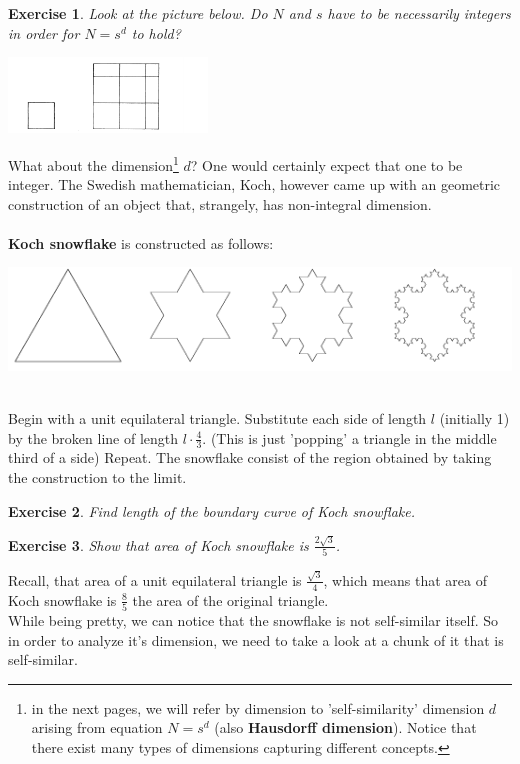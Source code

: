 \documentclass[12pt]{article}
\newtheorem{exercise}{Exercise}
\begin{document}
\begin{exercise}
Look at the picture below. Do $N$ and $s$ have to be necessarily integers in order for $N = s^d$ to hold?
\end{exercise}
\centerline{\includegraphics[width = 200px]{non_integer_square}\\}
\noindent What about the dimension\footnote{in the next pages, we will refer by dimension to 'self-similarity' dimension $d$ arising from equation $N = s^d$ (also \textbf{Hausdorff dimension}). Notice that there exist many types of dimensions capturing different concepts.} $d$? One would certainly expect that one to be integer. The Swedish mathematician, Koch, however came up with an geometric construction of an object that, strangely, has non-integral dimension. \\\\
\textbf{Koch snowflake} is constructed as follows: \\
\centerline{\includegraphics[width = \textwidth]{koch}}\\
Begin with a unit equilateral triangle. Substitute each side of length $l$ (initially 1) by the broken line of length $l\cdot\frac{4}{3}$. (This is just 'popping' a triangle in the middle third of a side) Repeat. The snowflake consist of the region obtained by taking the construction to the limit. 
\begin{exercise}
Find length of the boundary curve of Koch snowflake.
\end{exercise}
\begin{exercise}
Show that area of Koch snowflake is $\frac{2\sqrt{3}}{5}$.
\end{exercise}
\noindent Recall, that area of a unit equilateral triangle is $\frac{\sqrt{3}}{4}$, which means that area of Koch snowflake is $\frac{8}{5}$ the area of the original triangle. \\
While being pretty, we can notice that the snowflake is not self-similar itself. So in order to analyze it's dimension, we need to take a look at a chunk of it that is self-similar. \\
\end{document}
